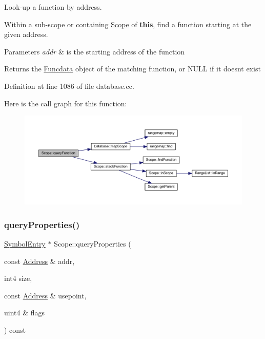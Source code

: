 Look-\/up a function by address. 

Within a sub-\/scope or containing \mbox{\hyperlink{class_scope}{Scope}} of {\bfseries{this}}, find a function starting at the given address. 
\begin{DoxyParams}{Parameters}
{\em addr} & is the starting address of the function \\
\hline
\end{DoxyParams}
\begin{DoxyReturn}{Returns}
the \mbox{\hyperlink{class_funcdata}{Funcdata}} object of the matching function, or N\+U\+LL if it doesn\textquotesingle{}t exist 
\end{DoxyReturn}


Definition at line 1086 of file database.\+cc.

Here is the call graph for this function\+:
\nopagebreak
\begin{figure}[H]
\begin{center}
\leavevmode
\includegraphics[width=350pt]{class_scope_a5d6c56240bdb6df2d2670077cf5e08ca_cgraph}
\end{center}
\end{figure}
\mbox{\label{class_scope_a1b8c2c2302eba2666e319a4c18a67d51}} 
\subsubsection{\texorpdfstring{queryProperties()}{queryProperties()}}
{\footnotesize\ttfamily \mbox{\hyperlink{class_symbol_entry}{Symbol\+Entry}} $\ast$ Scope\+::query\+Properties (\begin{DoxyParamCaption}\item[{const \mbox{\hyperlink{class_address}{Address}} \&}]{addr,  }\item[{int4}]{size,  }\item[{const \mbox{\hyperlink{class_address}{Address}} \&}]{usepoint,  }\item[{uint4 \&}]{flags }\end{DoxyParamCaption}) const}



